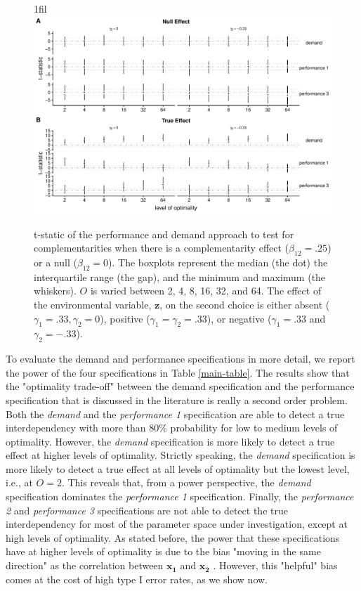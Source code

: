 \documentclass[12pt]{article}
\makeatletter
\newcommand*{\centerfloat}{%
  \parindent \z@
  \leftskip \z@ \@plus 1fil \@minus \textwidth
  \rightskip\leftskip
  \parfillskip \z@skip}
\makeatother
\begin{document}
\begin{figure}
\centerfloat
\includegraphics[width=450px]{figure-latex/main_new_plot.pdf}
\caption[Error Rate and Power of Demand and Performance Specification]
{\label{main} t-static of the performance and demand approach to test
for complementarities when there is a complementarity effect ($\beta_{12} = .25$)
or a null ($\beta_{12} = 0$). The boxplots represent the median (the dot) the
interquartile range (the gap), and the minimum and maximum (the whiskers). $O$
is varied between 2, 4, 8, 16, 32, and 64. The effect of the environmental
variable, $\mathbf{z}$, on the second choice is either absent 
($\gamma_1 = .33,  \gamma_2 = 0$), positive ($\gamma_1 = \gamma_2 = .33$), or negative ($\gamma_1 = .33$ and $\gamma_2 = -.33$).}
\end{figure}





To evaluate the demand and performance specifications in more detail, we report the power of the four specifications in Table \ref{main-table}. The results show that the "optimality trade-off" between the demand specification and the performance specification that is discussed in the literature \citep{grabner_management_2013, aral_three-way_2012, johansson_testing_2018} is really a second order problem. Both the \emph{demand} and the \emph{performance 1} specification are able to detect a true interdependency with more than $80\%$ probability for low to medium levels of optimality. However, the \emph{demand} specification is more likely to detect a true effect at higher levels of optimality. Strictly speaking, the \emph{demand} specification is more likely to detect a true effect at all levels of optimality but the lowest level, i.e., at \(O = 2\). This reveals that, from a power perspective, the \emph{demand} specification dominates the \emph{performance 1} specification. Finally, the \emph{performance 2} and \emph{performance 3} specifications are not able to detect the true interdependency for most of the parameter space under investigation, except at high levels of optimality. As stated before, the power that these specifications have at higher levels of optimality is due to the bias "moving in the same direction" as the correlation between \(\mathbf{x_1}\) and \(\mathbf{x_2}\) . However, this "helpful" bias comes at the cost of high type I error rates, as we show now.
\end{document}

